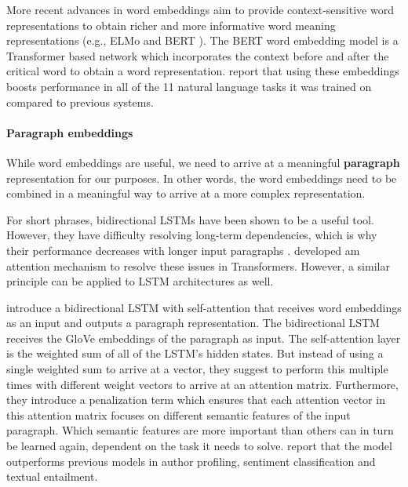 \documentclass[11pt,a4paper]{article}
\begin{document}
More recent advances in word embeddings aim to provide context-sensitive word representations to obtain richer and more informative word meaning representations (e.g., ELMo \cite{Peters:2018} and BERT \cite{Devlin:2018}). The BERT word embedding model is a Transformer based network which incorporates the context before and after the critical word to obtain a word representation. \citeauthor{Devlin:2018} report that using these embeddings boosts performance in all of the 11 natural language tasks it was trained on compared to previous systems.

\paragraph{Paragraph embeddings}
While word embeddings are useful, we need to arrive at a meaningful \textbf{paragraph} representation for our purposes. In other words, the word embeddings need to be combined in a meaningful way to arrive at a more complex representation.

For short phrases, bidirectional LSTMs \cite{Hochreiter:1997,Schuster:1997,Graves:2005} have been shown to be a useful tool. However, they have difficulty resolving long-term dependencies, which is why their performance decreases with longer input paragraphs \cite{Hochreiter:2001}. \cite{Vaswani:2017} developed am attention mechanism to resolve these issues in Transformers. However, a similar principle can be applied to LSTM architectures as well.

\cite{Lin:2017} introduce a bidirectional LSTM with self-attention that receives word embeddings as an input and outputs a paragraph representation. The bidirectional LSTM receives the GloVe embeddings of the paragraph as input. The self-attention layer is the weighted sum of all of the LSTM's hidden states. But instead of using a single weighted sum to arrive at a vector, they suggest to perform this multiple times with different weight vectors to arrive at an attention matrix. Furthermore, they introduce a penalization term which ensures that each attention vector in this attention matrix focuses on different semantic features of the input paragraph. Which semantic features are more important than others can in turn be learned again, dependent on the task it needs to solve. \citeauthor{Lin:2017} report that the model outperforms previous models in author profiling, sentiment classification and textual entailment.
\end{document}
